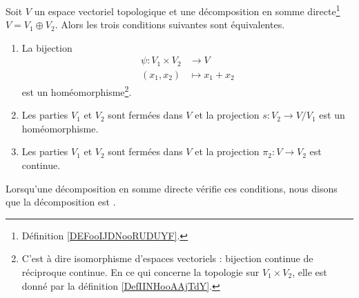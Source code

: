 \begin{propositionDef}     \label{PropKZDqTR}
	Soit \( V\) un espace vectoriel topologique et une décomposition en somme directe\footnote{Définition \ref{DEFooIJDNooRUDUYF}.} \( V=V_1\oplus V_2\). Alors les trois conditions suivantes sont équivalentes.
	\begin{enumerate}
		\item       \label{ITEMooMUELooWdJQeW}
		      La bijection
		      \begin{equation}
			      \begin{aligned}
				      \psi\colon V_1\times V_2 & \to V           \\
				      (x_1,x_2)                & \mapsto x_1+x_2
			      \end{aligned}
		      \end{equation}
		      est un homéomorphisme\footnote{C'est à dire isomorphisme d'espaces vectoriels : bijection continue de réciproque continue. En ce qui concerne la topologie sur \( V_1\times V_2\), elle est donné par la définition \ref{DefIINHooAAjTdY}.}.
		\item       \label{ITEMooDKOYooUpEfOR}
		      Les parties \( V_1\) et \( V_2\) sont fermées dans \( V\) et la projection \( s\colon V_2\to V/V_1\) est un homéomorphisme.
		\item       \label{ITEMooFSSMooCQzTIc}
		      Les parties \( V_1\) et \( V_2\) sont fermées dans \( V\) et la projection \( \pi_2\colon V \to V_2 \) est continue.
	\end{enumerate}
	Lorsqu'une décomposition en somme directe vérifie ces conditions, nous disons que la décomposition est .
\end{propositionDef}

